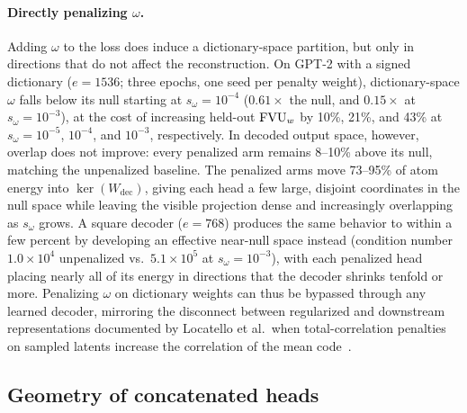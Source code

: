 \paragraph{Directly penalizing $\omega$.} Adding $\omega$ to the loss does
induce a dictionary-space partition, but only in directions that do not
affect the reconstruction. On GPT-2 with a signed dictionary ($e{=}1536$;
three epochs, one seed per penalty weight), dictionary-space $\omega$
falls below its null starting at $s_\omega{=}10^{-4}$ ($0.61\times$ the
null, and $0.15\times$ at $s_\omega{=}10^{-3}$), at the cost of
increasing held-out $\mathrm{FVU}_w$ by 10\%, 21\%, and 43\% at
$s_\omega{=}10^{-5}$, $10^{-4}$, and $10^{-3}$, respectively. In decoded
output space, however, overlap does not improve: every penalized arm
remains 8--10\% above its null, matching the unpenalized baseline. The
penalized arms move 73--95\% of atom energy into $\ker(W_{\mathrm{dec}})$,
giving each head a few large, disjoint coordinates in the null space while
leaving the visible projection dense and increasingly overlapping as
$s_\omega$ grows. A square decoder ($e{=}768$) produces the same behavior
to within a few percent by developing an effective near-null space instead
(condition number $1.0\times10^4$ unpenalized vs.\ $5.1\times10^5$ at
$s_\omega{=}10^{-3}$), with each penalized head placing nearly all of its
energy in directions that the decoder shrinks tenfold or more. Penalizing
$\omega$ on dictionary weights can thus be bypassed through any learned
decoder, mirroring the disconnect between regularized and downstream
representations documented by Locatello et al.\ when total-correlation
penalties on sampled latents increase the correlation of the mean
code~\cite[§5.1]{locatello2019}.

\subsection{Geometry of concatenated heads}
\label{sec:concatgeom}


